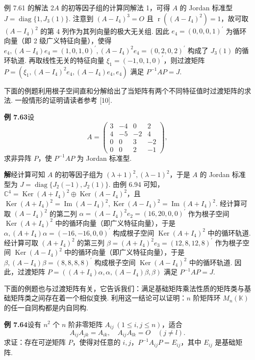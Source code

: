 \documentclass[UTF8, 12pt, fontset=fandol, oneside]{ctexart}
\begin{document}
例 7.61 的解法 2\quad $A$ 的初等因子组的计算同解法 1，可得 $A$ 的 Jordan 标准型 $J=\operatorname{diag}\{1,J_3(1)\}$. 注意到 $(A-I_4)^3=O$ 且 $\operatorname{r}((A-I_4)^2)=1$，故可取 $(A-I_4)^2$ 的第 4 列作为其列向量的极大无关组. 因此 $e_4=(0,0,0,1)^{\prime}$ 为循环向量（即 2 级广义特征向量），使得 $e_4,(A-I_4)e_4=(1,0,1,0)^{\prime},(A-I_4)^2e_4=(0,2,0,2)^{\prime}$ 构成了 $J_3(1)$ 的循环轨道. 再取线性无关的特征向量 $\xi_1=(-1,0,1,0)^{\prime}$，则过渡矩阵 $P=(\xi_1,(A-I_4)^2e_4,(A-I_4)e_4,e_4)$ 满足 $P^{-1}AP=J$.

下面的例题利用根子空间直和分解给出了当矩阵有两个不同特征值时过渡矩阵的求法. 一般情形的证明请读者参考 [10].

\noindent\textbf{例 7.63}\quad 设
\[
A=\left(\begin{array}{rrrr}
3&-4&0&2\\
4&-5&-2&4\\
0&0&3&-2\\
0&0&2&-1
\end{array}\right),
\]
求非异阵 $P$，使 $P^{-1}AP$ 为 Jordan 标准型.

\noindent\textbf{解}\quad 经计算可知 $A$ 的初等因子组为 $(\lambda+1)^2,(\lambda-1)^2$，于是 $A$ 的 Jordan 标准型为 $J=\operatorname{diag}\{J_2(-1),J_2(1)\}$. 由例 6.94 可知，$\mathbb{C}^4=\operatorname{Ker}(A+I_4)^2\oplus\operatorname{Ker}(A-I_4)^2$，且 $\operatorname{Ker}(A+I_4)^2=\operatorname{Im}(A-I_4)^2,\operatorname{Ker}(A-I_4)^2=\operatorname{Im}(A+I_4)^2$. 经计算可取 $(A-I_4)^2$ 的第二列 $\alpha=(A-I_4)^2e_2=(16,20,0,0)^{\prime}$ 作为根子空间 $\operatorname{Ker}(A+I_4)^2$ 中的循环向量（即广义特征向量），于是 $\alpha,(A+I_4)\alpha=(-16,-16,0,0)^{\prime}$ 构成根子空间 $\operatorname{Ker}(A+I_4)^2$ 中的循环轨道. 经计算可取 $(A+I_4)^2$ 的第三列 $\beta=(A+I_4)^2e_3=(12,8,12,8)^{\prime}$ 作为根子空间 $\operatorname{Ker}(A-I_4)^2$ 中的循环向量（即广义特征向量），于是 $\beta,(A-I_4)\beta=(8,8,8,8)^{\prime}$ 构成根子空间 $\operatorname{Ker}(A-I_4)^2$ 中的循环轨道. 因此，过渡矩阵 $P=((A+I_4)\alpha,\alpha,(A-I_4)\beta,\beta)$ 满足 $P^{-1}AP=J$.

下面的例题也与过渡矩阵有关，它告诉我们：满足基础矩阵乘法性质的矩阵类与基础矩阵类之间存在着一个相似变换. 利用这一结论可以证明：$n$ 阶矩阵环 $M_n(\mathbb{K})$ 的任一自同构都是内自同构.

\noindent\textbf{例 7.64}\quad 设有 $n^2$ 个 $n$ 阶非零矩阵 $A_{ij}\ (1\le i,j\le n)$，适合
\[
A_{ij}A_{jk}=A_{ik},\quad A_{ij}A_{lk}=O\quad (j\ne l).
\]
求证：存在可逆矩阵 $P$，使得对任意的 $i,j$，$P^{-1}A_{ij}P=E_{ij}$，其中 $E_{ij}$ 是基础矩阵.
\end{document}
